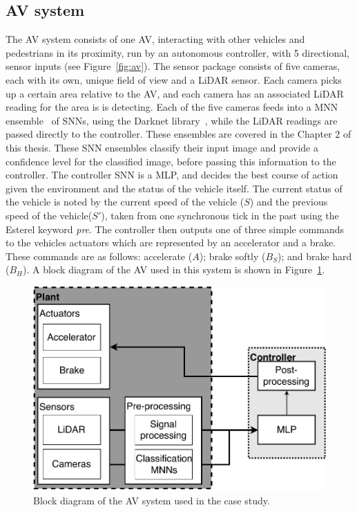 \subsection{\acf{AV} system}
The \ac{AV} system consists of one \acf{AV}, interacting with other vehicles and pedestrians in its proximity, run by an autonomous controller, with 5 directional, sensor inputs (see Figure~\ref{fig:av}).
The sensor package consists of five cameras, each with its own, unique field of view and a \acf{LiDAR} sensor.
Each camera picks up a certain area relative to the \ac{AV}, and each camera has an associated \ac{LiDAR} reading for the area is is detecting.
Each of the five cameras feeds into a \acf{MNN} ensemble~\cite{Maqsood2004} of \acp{SNN}, using the Darknet library~\cite{darknet13}, while the \ac{LiDAR} readings are passed directly to the controller.
These ensembles are covered in the Chapter 2 of this thesis.
These \ac{SNN} ensembles classify their input image and provide a confidence level for the classified image, before passing this information to the controller.
The controller \ac{SNN} is a \ac{MLP}, and decides the best course of action given the environment and the status of the vehicle itself. 
The current status of the vehicle is noted by the current speed of the vehicle ($S$) and the previous speed of the vehicle($S'$), taken from one synchronous tick in the past using the Esterel keyword \textit{pre}.
The controller then outputs one of three simple commands to the vehicles actuators which are represented by an accelerator and a brake.
These commands are as follows: accelerate ($A$); brake softly ($B_S$); and brake hard ($B_H$).
A block diagram of the \ac{AV} used in this system is shown in Figure~\ref{fig:avnenf}. 

\begin{figure}[h]
	\centering
	\includegraphics[scale=0.6]{Content/fig/AV-sys-nenf.pdf}
	\caption{Block diagram of the \ac{AV} system used in the case study. \label{fig:avnenf}}
\end{figure}

